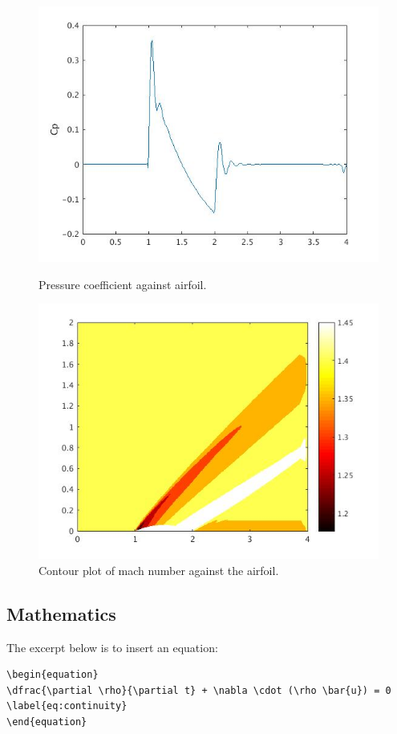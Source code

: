 \documentclass[a4paper,12pt]{article}
\begin{document}
\begin{figure}[!htbp]
\centering
\begin{minipage}[t]{0.48\textwidth} 
\includegraphics[width= \textwidth]{Figures/cp.jpg}
\caption{Pressure coefficient against airfoil.}
\label{fig:cp}
\end{minipage}
\begin{minipage}[t]{0.48\textwidth} 
\includegraphics[width= \textwidth]{Figures/machcontour.jpg}
\caption{Contour plot of mach number against the airfoil.}
\label{fig:mach}
\end{minipage}
\end{figure}    

\newpage
\subsection{Mathematics}
The excerpt below is to insert an equation:
\begin{lstlisting}
\begin{equation}
\dfrac{\partial \rho}{\partial t} + \nabla \cdot (\rho \bar{u}) = 0
\label{eq:continuity}
\end{equation}
\end{lstlisting}
\end{document}
